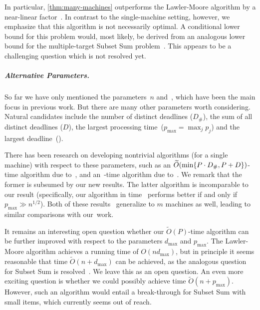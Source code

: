 \documentclass[10pt,a4paper]{article}
\makeatletter
\newcommand\IfRestateTF{%
  \ifx\label\thmt@gobble@label %
    \expandafter\@firstoftwo
  \else
    \expandafter\@secondoftwo
  \fi
}
\newcommand{\RestateRemark}{\IfRestateTF{{\normalfont\bfseries (Restated) }}{}}
\DeclarePairedDelimiter\set{\lbrace}{\rbrace}
\newcommand\Order{O}
\newcommand\order{o}
\newcommand\MTPT{\smash{$1||\sum p_j U_j$}}
\newcommand\mMTPT{\smash{$P_m||\sum p_j U_j$}}
\makeatother
\begin{document}

In particular, \cref{thm:many-machines} outperforms the Lawler-Moore algorithm by a near-linear factor~. In contrast to the single-machine setting, however, we emphasize that this algorithm is not necessarily optimal. A conditional lower bound for this problem would, most likely, be derived from an analogous lower bound for the multiple-target Subset Sum problem~\cite{AntonopoulosPPV23}. This appears to be a challenging question which is not resolved yet.

\subparagraph{Alternative Parameters.}
So far we have only mentioned the parameters~$n$ and~, which have been the main focus in previous work. But there are many other parameters worth considering. Natural candidates include the number of distinct deadlines ($D_\#$), the sum of all distinct deadlines ($D$), the largest processing time~($p_{\max} = \max_j p_j$) and the largest deadline~().

There has been research on developing nontrivial \MTPT{} algorithms (for a single machine) with respect to these parameters, such as an $\widetilde\Order(\min\set{P \cdot D_\#, P + D})$-time algorithm due to~\cite{BringmannFHSW22}, and an~\smash{$\widetilde\Order(n + p_{\max}^3)$}-time algorithm due to~\cite{KleinPR23}. We remark that the former is subsumed by our new results. The latter algorithm is incomparable to our result (specifically, our algorithm in time~\smash{$\widetilde\Order(P) = \widetilde\Order(n p_{\max})$} performs better if and only if $p_{\max} \gg n^{1/2}$). Both of these results~\cite{BringmannFHSW22,KleinPR23} generalize to $m$ machines as well, leading to similar comparisons with our~work.

It remains an interesting open question whether our $\widetilde\Order(P)$-time algorithm can be further improved with respect to the parameters $d_{\max}$ and $p_{\max}$. The Lawler-Moore algorithm achieves a running time of $O(n d_{\max})$, but in principle it seems reasonable that time $\widetilde\Order(n + d_{\max})$ can be achieved, as the analogous question for Subset Sum is resolved~\cite{Bringmann17,JinW19}. We leave this as an open question. An even more exciting question is whether we could possibly achieve time $\widetilde\Order(n + p_{\max})$. However, such an algorithm would entail a break-through for Subset Sum with small items, which currently seems out of reach.
\end{document}

